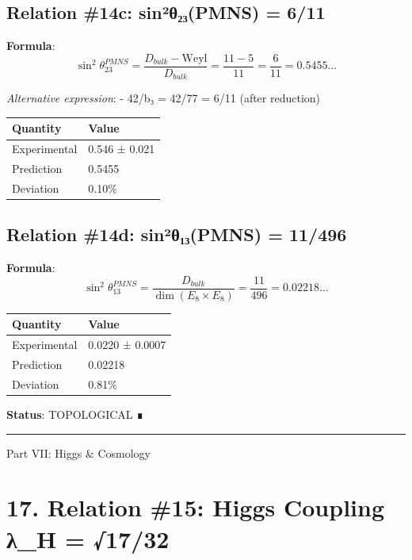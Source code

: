 \documentclass[11pt,a4paper]{article}
\begin{document}
\subsection{Relation \#14c: sin²θ₂₃(PMNS) = 6/11}\label{relation-14c-sinuxb2ux3b8ux2082ux2083pmns-611}

\textbf{Formula}: \[\sin^2\theta_{23}^{PMNS} = \frac{D_{bulk} - \text{Weyl}}{D_{bulk}} = \frac{11 - 5}{11} = \frac{6}{11} = 0.5455...\]

\emph{Alternative expression}: - 42/b₃ = 42/77 = 6/11 (after reduction)

\begin{longtable}[]{@{}ll@{}}
\toprule\noalign{}
Quantity & Value \\
\midrule\noalign{}
\endhead
\bottomrule\noalign{}
\endlastfoot
Experimental & 0.546 ± 0.021 \\
Prediction & 0.5455 \\
Deviation & 0.10\% \\
\end{longtable}

\subsection{Relation \#14d: sin²θ₁₃(PMNS) = 11/496}\label{relation-14d-sinuxb2ux3b8ux2081ux2083pmns-11496}

\textbf{Formula}: \[\sin^2\theta_{13}^{PMNS} = \frac{D_{bulk}}{\dim(E_8 \times E_8)} = \frac{11}{496} = 0.02218...\]

\begin{longtable}[]{@{}ll@{}}
\toprule\noalign{}
Quantity & Value \\
\midrule\noalign{}
\endhead
\bottomrule\noalign{}
\endlastfoot
Experimental & 0.0220 ± 0.0007 \\
Prediction & 0.02218 \\
Deviation & 0.81\% \\
\end{longtable}

\textbf{Status}: TOPOLOGICAL ∎

\begin{center}\rule{\linewidth}{0.5pt}\end{center}

Part VII: Higgs \& Cosmology

\section{17. Relation \#15: Higgs Coupling λ\_\allowbreak{}H = √17/32}\label{relation-15-higgs-coupling-ux3bb_h-1732}
\end{document}
